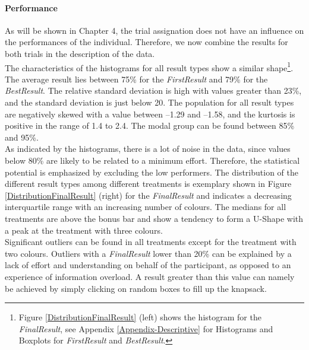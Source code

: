 \paragraph{Performance}
\label{ch:Evaluation:sec:DescriptiveStatistics:subsec:Performance}
As will be shown in Chapter 4, the trial assignation does not have an influence on the performances of the individual. Therefore, we now combine the results for both trials in the description of the data.\\
The characteristics of the histograms for all result types show a similar shape\footnote{Figure \ref{DistributionFinalResult} (left) shows the histogram for the \textit{FinalResult}, see Appendix \ref{Appendix-Descriptive} for Histograms and Boxplots for \textit{FirstResult} and \textit{BestResult}.}. The average result lies between 75\% for the \textit{FirstResult} and 79\% for the \textit{BestResult}. The relative standard deviation is high with values greater than 23\%, and the standard deviation is just below 20. 
The population for all result types are negatively skewed with a value between --1.29 and --1.58, and the kurtosis is positive in the range of 1.4 to 2.4. The modal group can be found between 85\% and 95\%.\\
As indicated by the histograms, there is a lot of noise in the data, since values below 80\% are likely to be related to a minimum effort. Therefore, the statistical potential is emphasized by excluding the low performers.
The distribution of the different result types among different treatments is exemplary shown in Figure \ref{DistributionFinalResult} (right) for the \textit{FinalResult} and indicates a decreasing interquartile range with an increasing number of colours. The medians for all treatments are above the bonus bar and show a tendency to form a U-Shape with a peak at the treatment with three colours.\\
Significant outliers can be found in all treatments except for the treatment with two colours. Outliers with a \textit{FinalResult} lower than 20\% can be explained by a lack of effort and understanding on behalf of the participant, as opposed to an experience of information overload. A result greater than this value can namely be achieved by simply clicking on random boxes to fill up the knapsack.
